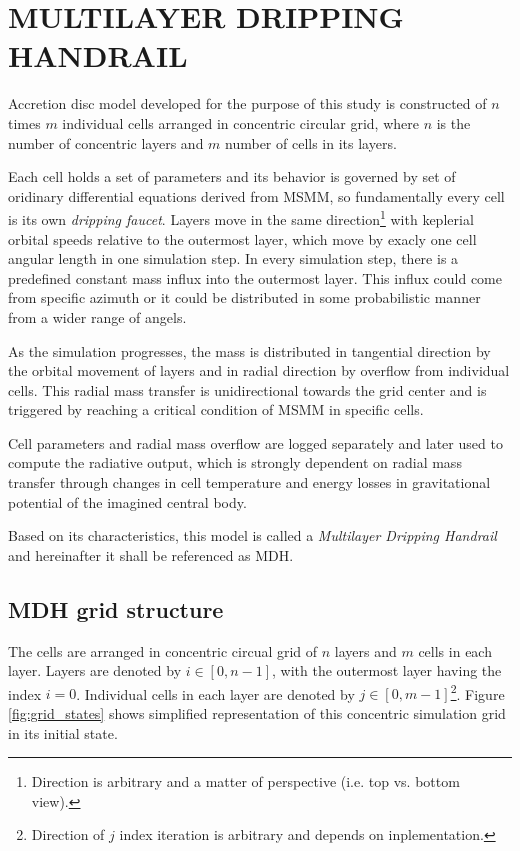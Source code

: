 \chapter{MULTILAYER DRIPPING HANDRAIL}
\thispagestyle{empty}

Accretion disc model developed for the purpose of this study is constructed of $n$ times $m$ individual cells arranged in concentric circular grid, where $n$ is the number of concentric layers and $m$ number of cells in its layers. 

Each cell holds a set of parameters and its behavior is governed by set of oridinary differential equations derived from MSMM, so fundamentally every cell is its own \emph{dripping faucet}. Layers move in the same direction\footnote{Direction is arbitrary and a matter of perspective (i.e. top vs. bottom view).} with keplerial orbital speeds relative to the outermost layer, which move by exacly one cell angular length in one simulation step. In every simulation step, there is a predefined constant mass influx into the outermost layer. This influx could come from specific azimuth or it could be distributed in some probabilistic manner from a wider range of angels.

As the simulation progresses, the mass is distributed in tangential direction by the orbital movement of layers and in radial direction by overflow from individual cells. This radial mass transfer is unidirectional towards the grid center and is triggered by reaching a critical condition of MSMM in specific cells. 

Cell parameters and radial mass overflow are logged separately and later used to compute the radiative output, which is strongly dependent on radial mass transfer through changes in cell temperature and energy losses in gravitational potential of the imagined central body. 

Based on its characteristics, this model is called a \emph{Multilayer Dripping Handrail} and hereinafter it shall be referenced as MDH.

\section{MDH grid structure}

The cells are arranged in concentric circual grid of $n$ layers and $m$ cells in each layer. Layers are denoted by $i \in [0, n-1]$, with the outermost layer having the index $i = 0$. Individual cells in each layer are denoted by $j \in [0, m-1]$\footnote{Direction of $j$ index iteration is arbitrary and depends on inplementation.}. Figure \ref{fig:grid_states} shows simplified representation of this concentric simulation grid in its initial state. 

